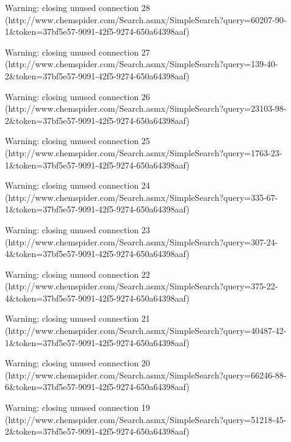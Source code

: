 \documentclass[article, shortnames]{jss}\usepackage[]{graphicx}\usepackage[]{color}
\begin{document}
\begin{CodeChunk}
\begin{CodeOutput}
\end{CodeOutput}
\begin{CodeOutput}
Warning: closing unused connection 28 (http://www.chemspider.com/Search.asmx/SimpleSearch?query=60207-90-1&token=37bf5e57-9091-42f5-9274-650a64398aaf)
\end{CodeOutput}
\begin{CodeOutput}
Warning: closing unused connection 27 (http://www.chemspider.com/Search.asmx/SimpleSearch?query=139-40-2&token=37bf5e57-9091-42f5-9274-650a64398aaf)
\end{CodeOutput}
\begin{CodeOutput}
Warning: closing unused connection 26 (http://www.chemspider.com/Search.asmx/SimpleSearch?query=23103-98-2&token=37bf5e57-9091-42f5-9274-650a64398aaf)
\end{CodeOutput}
\begin{CodeOutput}
Warning: closing unused connection 25 (http://www.chemspider.com/Search.asmx/SimpleSearch?query=1763-23-1&token=37bf5e57-9091-42f5-9274-650a64398aaf)
\end{CodeOutput}
\begin{CodeOutput}
Warning: closing unused connection 24 (http://www.chemspider.com/Search.asmx/SimpleSearch?query=335-67-1&token=37bf5e57-9091-42f5-9274-650a64398aaf)
\end{CodeOutput}
\begin{CodeOutput}
Warning: closing unused connection 23 (http://www.chemspider.com/Search.asmx/SimpleSearch?query=307-24-4&token=37bf5e57-9091-42f5-9274-650a64398aaf)
\end{CodeOutput}
\begin{CodeOutput}
Warning: closing unused connection 22 (http://www.chemspider.com/Search.asmx/SimpleSearch?query=375-22-4&token=37bf5e57-9091-42f5-9274-650a64398aaf)
\end{CodeOutput}
\begin{CodeOutput}
Warning: closing unused connection 21 (http://www.chemspider.com/Search.asmx/SimpleSearch?query=40487-42-1&token=37bf5e57-9091-42f5-9274-650a64398aaf)
\end{CodeOutput}
\begin{CodeOutput}
Warning: closing unused connection 20 (http://www.chemspider.com/Search.asmx/SimpleSearch?query=66246-88-6&token=37bf5e57-9091-42f5-9274-650a64398aaf)
\end{CodeOutput}
\begin{CodeOutput}
Warning: closing unused connection 19 (http://www.chemspider.com/Search.asmx/SimpleSearch?query=51218-45-2&token=37bf5e57-9091-42f5-9274-650a64398aaf)

\end{CodeOutput}
\end{CodeChunk}
\end{document}
